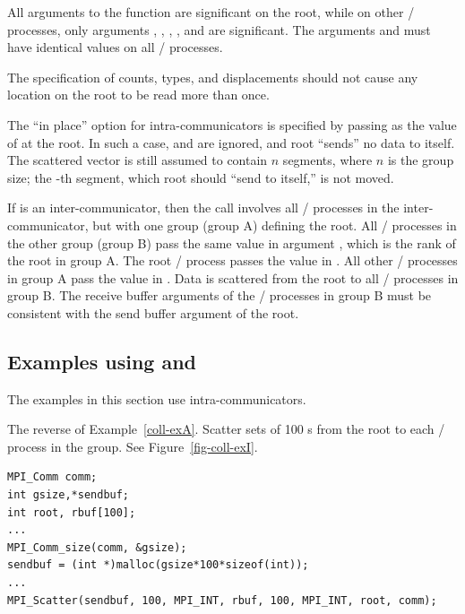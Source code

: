 All arguments to the function are significant on the root,
while on other \MPI/ processes, only arguments , ,
, ,
and
 are significant.
The arguments  and 
must have identical values on all \MPI/ processes.

The specification of counts, types, and displacements
should not cause any location on the root to be read more than
once.

The ``in place'' option  for intra-communicators is specified by passing
 as
the value of  at the root.  In such a case,
 and  are ignored, and root
``sends'' no data to itself. The scattered vector is still assumed to
contain $n$ segments, where $n$ is the group size; the -th
segment, which root should ``send to itself,'' is not moved.

If  is an inter-communicator, then the call involves all
\MPI/ processes in the inter-communicator, but with one group (group A) defining the
root.  All \MPI/ processes in the other group (group B) pass the same value
in argument
, which is the rank of the root in group A.  The root
\MPI/ process passes the value  in .
All other \MPI/ processes in group A pass the value  in
.
Data is scattered from the root to all \MPI/ processes in
group B.  The receive buffer arguments of the \MPI/ processes in group B
must be consistent with the send buffer argument of the root.

\subsection{Examples using \texorpdfstring{}{MPI\_SCATTER} and \texorpdfstring{}{MPI\_SCATTERV}}

The examples in this section use intra-communicators.

\begin{example}
\label{coll-exI}
%
The reverse of Example~\ref{coll-exA}.
Scatter sets of 100 s from the root to each \MPI/ process in the group.
See Figure~\ref{fig-coll-exI}.

\begin{lstlisting}[language={[MPI]C}]
MPI_Comm comm;
int gsize,*sendbuf;
int root, rbuf[100];
...
MPI_Comm_size(comm, &gsize);
sendbuf = (int *)malloc(gsize*100*sizeof(int));
...
MPI_Scatter(sendbuf, 100, MPI_INT, rbuf, 100, MPI_INT, root, comm);
\end{lstlisting}
\end{example}

